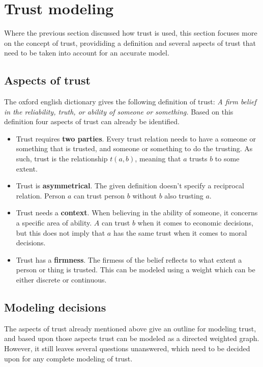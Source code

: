 \documentclass{llncs}
\begin{document}
\section{Trust modeling}
Where the previous section discussed how trust is used, this section focuses more on the concept of trust, provididing a definition and several aspects of trust that need to be taken into account for an accurate model.     

\subsection{Aspects of trust}
The oxford english dictionary gives the following definition of trust: \emph{A firm belief in the reliability, truth, or ability of someone or something.}\cite{Press} Based on this definition four aspects of trust can already be identified.

\begin{itemize}
\item Trust requires \textbf{two parties}. Every trust relation needs to have a someone or something that is trusted, and someone or something to do the trusting. As such, trust is the relationship $t(a,b)$, meaning that $a$ trusts $b$ to some extent.
\item Trust is \textbf{asymmetrical}. The given definition doesn't specify a reciprocal relation. Person $a$ can trust person $b$ without $b$ also trusting $a$.
\item Trust needs a \textbf{context}. When believing in the ability of someone, it concerns a specific area of ability. $A$ can trust $b$ when it comes to economic decisions, but this does not imply that $a$ has the same trust when it comes to moral decisions.
\item Trust has a \textbf{firmness}. The firmess of the belief reflects to what extent a person or thing is trusted. This can be modeled using a weight which can be either discrete or continuous.
\end{itemize}

\subsection{Modeling decisions}
The aspects of trust already mentioned above give an outline for modeling trust, and based upon those aspects trust can be modeled as a directed weighted graph. However, it still leaves several questions unanswered, which need to be decided upon for any complete modeling of trust.
\end{document}
